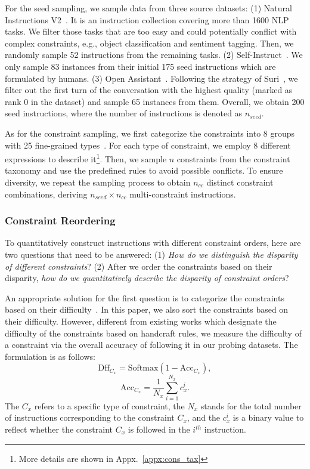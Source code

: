 For the seed sampling, we sample data from three source datasets: (1) Natural Instructions V2~\cite{wang2022supernaturalinstructions}. It is an instruction collection covering more than 1600 NLP tasks. We filter those tasks that are too easy and could potentially conflict with complex constraints, e.g., object classification and sentiment tagging. Then, we randomly sample 52 instructions from the remaining tasks. (2) Self-Instruct~\cite{wang2023self}. We only sample 83 instances from their initial 175 seed instructions which are formulated by humans. (3) Open Assistant~\cite{kopf2024openassistant}. Following the strategy of Suri~\cite{li2023self}, we filter out the first turn of the conversation with the highest quality (marked as rank 0 in the dataset) and sample 65 instances from them. Overall, we obtain 200 seed instructions, where the number of instructions is denoted as $n_{seed}$.

As for the constraint sampling, we first categorize the constraints into 8 groups with 25 fine-grained types~\cite{zhou2023instructionfollowing}. For each type of constraint, we employ 8 different expressions to describe it\footnote{More details are shown in Appx.~\ref{appx:cons_tax}}. Then, we sample $n$ constraints from the constraint taxonomy and use the predefined rules to avoid possible conflicts. To ensure diversity, we repeat the sampling process to obtain $n_{cc}$ distinct constraint combinations, deriving $n_{seed}\times n_{cc}$ multi-constraint instructions.






\subsubsection{Constraint Reordering} \label{reorder}
To quantitatively construct instructions with different constraint orders, here are two questions that need to be answered: (1) \textit{How do we distinguish the disparity of different constraints}? (2) After we order the constraints based on their disparity, \textit{how do we quantitatively describe the disparity of constraint orders}?

An appropriate solution for the first question is to categorize the constraints based on their difficulty~\cite{chen2024sifo}. In this paper, we also sort the constraints based on their difficulty. However, different from existing works which designate the difficulty of the constraints based on handcraft rules, we measure the difficulty of a constraint via the overall accuracy of following it in our probing datasets. The formulation is as follows:
\begin{equation}
\label{eq2}
    \text{Dff}_{C_x}= \text{Softmax}(1-\text{Acc}_{C_{x}}), 
\end{equation}
\begin{equation}
    \label{eq3}
    \text{Acc}_{C_x} = \frac{1}{N_{x}}\sum_{i=1}^{N_{x}}c_x^i.
\end{equation}
The $C_x$ refers to a specific type of constraint, the $N_{x}$ stands for the total number of instructions corresponding to the constraint $C_{x}$, and the $c_x^i$ is a binary value to reflect whether the constraint $C_{x}$ is followed in the $i^{th}$ instruction. 

